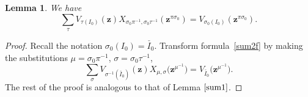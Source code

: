\documentclass[pdftex]{sigma}
\numberwithin{equation}{section}
\newtheorem{Lemma}[Theorem]{Lemma}
\begin{document}
\begin{Lemma}\label{sum2} We have
\begin{equation}\label{sum2f}
\sum_{\tau}V_{\tau(I_0)}(\boldsymbol{z})X_{\sigma_0\pi^{-1},\sigma_0\tau^{-1}}(\boldsymbol{z}^{\pi\sigma_0})=V_{\sigma_0(I_0)}(\boldsymbol{z}^{\pi\sigma_0}).
\end{equation}
\end{Lemma}
\begin{proof}
Recall the notation $\sigma_0(I_0)=\check{I_0}$. Transform formula~\eqref{sum2f} by making the substitutions $\mu=\sigma_0\pi^{-1}$, $\sigma=\sigma_0\tau^{-1}$,{\samepage
\begin{equation}\label{sum2fn}
\sum_{\sigma}V_{\sigma^{-1}(\check{I_0})}(\boldsymbol{z})X_{\mu, \sigma }\bigl(\boldsymbol{z}^{\mu^{-1}}\bigr)=V_{\check{I_0}}\bigl(\boldsymbol{z}^{\mu^{-1}}\bigr).
\end{equation}
The rest of the proof is analogous to that of Lemma $\ref{sum1}$.}


\end{proof}
\end{document}
